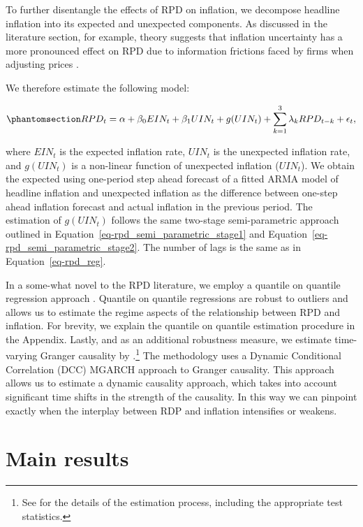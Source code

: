 \documentclass[
  letterpaper,
  DIV=11,
  numbers=noendperiod]{scrartcl}
\begin{document}
To further disentangle the effects of RPD on inflation, we decompose
headline inflation into its expected and unexpected components. As
discussed in the literature section, for example, theory suggests that
inflation uncertainty has a more pronounced effect on RPD due to
information frictions faced by firms when adjusting prices
\citep{lucas1973, hercowitz1981, cukierman1983}.

We therefore estimate the following model:

\begin{equation}\phantomsection\label{eq-unexpected}{ RPD_t = \alpha + \beta_0 EIN_t + \beta_1 UIN_t + g(UIN_t) + \sum_{k=1}^{3}\lambda_k RPD_{t-k} + \epsilon_t, }\end{equation}

where \(EIN_t\) is the expected inflation rate, \(UIN_t\) is the
unexpected inflation rate, and \(g(UIN_t)\) is a non-linear function of
unexpected inflation (\(UIN_t\)). We obtain the expected using
one-period step ahead forecast of a fitted ARMA model of headline
inflation and unexpected inflation as the difference between one-step
ahead inflation forecast and actual inflation in the previous period.
The estimation of \(g(UIN_t)\) follows the same two-stage
semi-parametric approach outlined in
Equation~\ref{eq-rpd_semi_parametric_stage1} and
Equation~\ref{eq-rpd_semi_parametric_stage2}. The number of lags is the
same as in Equation~\ref{eq-rpd_reg}.

In a some-what novel to the RPD literature, we employ a quantile on
quantile regression approach \citep{koenker2017}. Quantile on quantile
regressions are robust to outliers and allows us to estimate the regime
aspects of the relationship between RPD and inflation. For brevity, we
explain the quantile on quantile estimation procedure in the Appendix.
Lastly, and as an additional robustness measure, we estimate
time-varying Granger causality by \citet{lu2014}.\footnote{See
  \citet{lu2014} for the details of the estimation process, including
  the appropriate test statistics.} The \citet{lu2014} methodology uses
a Dynamic Conditional Correlation (DCC) MGARCH approach to Granger
causality. This approach allows us to estimate a dynamic causality
approach, which takes into account significant time shifts in the
strength of the causality. In this way we can pinpoint exactly when the
interplay between RDP and inflation intensifies or weakens.

\section{Main results}\label{main-results}
\end{document}
